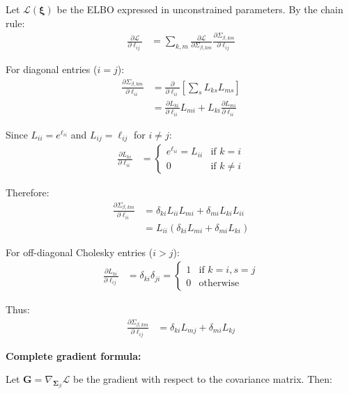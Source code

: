 \documentclass[11pt,a4paper]{article}
\begin{document}
Let $\mathcal{L}(\bm{\xi})$ be the ELBO expressed in unconstrained parameters. By the chain rule:
\begin{align}
\frac{\partial \mathcal{L}}{\partial \ell_{ij}} &= \sum_{k,m} \frac{\partial \mathcal{L}}{\partial \Sigma_{\beta,km}} \frac{\partial \Sigma_{\beta,km}}{\partial \ell_{ij}}
\end{align}

For diagonal entries ($i=j$):
\begin{align}
\frac{\partial \Sigma_{\beta,km}}{\partial \ell_{ii}} &= \frac{\partial}{\partial \ell_{ii}} \left[\sum_s L_{ks} L_{ms}\right]\\
&= \frac{\partial L_{ki}}{\partial \ell_{ii}} L_{mi} + L_{ki} \frac{\partial L_{mi}}{\partial \ell_{ii}}
\end{align}

Since $L_{ii} = e^{\ell_{ii}}$ and $L_{ij} = \ell_{ij}$ for $i \ne j$:
\begin{align}
\frac{\partial L_{ki}}{\partial \ell_{ii}} &= \begin{cases}
e^{\ell_{ii}} = L_{ii} & \text{if } k = i\\
0 & \text{if } k \ne i
\end{cases}
\end{align}

Therefore:
\begin{align}
\frac{\partial \Sigma_{\beta,km}}{\partial \ell_{ii}} &= \delta_{ki} L_{ii} L_{mi} + \delta_{mi} L_{ki} L_{ii}\\
&= L_{ii} (\delta_{ki} L_{mi} + \delta_{mi} L_{ki})
\end{align}

For off-diagonal Cholesky entries ($i > j$):
\begin{align}
\frac{\partial L_{ki}}{\partial \ell_{ij}} &= \delta_{ki} \delta_{ji} = \begin{cases}
1 & \text{if } k=i, s=j\\
0 & \text{otherwise}
\end{cases}
\end{align}

Thus:
\begin{align}
\frac{\partial \Sigma_{\beta,km}}{\partial \ell_{ij}} &= \delta_{ki} L_{mj} + \delta_{mi} L_{kj}
\end{align}

\textbf{Complete gradient formula:}

Let $\bm{G} = \nabla_{\bm{\Sigma}_\beta} \mathcal{L}$ be the gradient with respect to the covariance matrix. Then:
\end{document}
